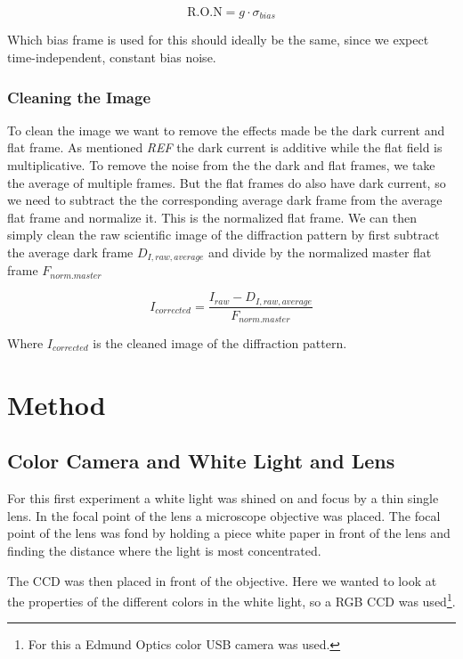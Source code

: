 \documentclass{emulateapj}
\begin{document}
\begin{equation}
\text{R.O.N} = g\cdot\sigma_{bias}
\end{equation}

Which bias frame is used for this should ideally be the same, since we expect time-independent, constant bias noise.

\subsubsection{Cleaning the Image}
\label{sec:cleaning}
To clean the image we want to remove the effects made be the dark current and flat frame. As mentioned \emph{REF} the dark current is additive while the flat field is multiplicative. To remove the noise from the the dark and flat frames, we take the average of multiple frames. But the flat frames do also have dark current, so we need to subtract the the corresponding average dark frame from the average flat frame and normalize it. This is the normalized flat frame. We can then simply clean the raw scientific image of the diffraction pattern by first subtract the average dark frame $D_{I,raw,average}$ and divide by the normalized master flat frame $F_{norm. master}$

\begin{equation}
I_{corrected} = \frac{I_{raw} - D_{I,raw,average}}{F_{norm. master}}
\label{eq:ICorr}
\end{equation}

Where $I_{corrected}$ is the cleaned image of the diffraction pattern.
\section{Method}
\label{sec:method}

\subsection{Color Camera and White Light and Lens}
For this first experiment a white light was shined on and focus by a thin single lens. In the focal point of the lens a microscope objective was placed. The focal point of the lens was fond by holding a piece white paper in front of the lens and finding the distance where the light is most concentrated. 

The CCD was then placed in front of the objective. Here we wanted to look at the properties of the different colors in the white light, so a RGB CCD was used\footnote{For this a Edmund Optics color USB camera was used.}. 
\end{document}
